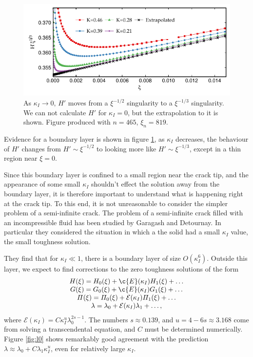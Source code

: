 \documentclass{jfm}
\begin{document}
\begin{figure}
  \centerline{\includegraphics{./../../Graphs/hprime-x.pdf}}
  \caption{As $\kappa_I\to 0$, $H'$ moves from a $\xi^{-1/2}$ singularity
           to a $\xi^{-1/3}$ singularity. We can not calculate $H'$ for $\kappa_I=0$, 
           but the extrapolation to it is shown. Figure produced with $n=465$,
           $\xi_n = 819$.}\label{fig:hprime-x}
\end{figure}
Evidence for a boundary layer is shown in figure \ref{fig:hprime-x}, as
$\kappa_I$ decreases, the behaviour of $H'$ changes from $H' \sim \xi^{-1/2}$
to looking more like $H' \sim \xi^{-1/3}$, except in a thin region near 
$\xi =0$.

Since this boundary layer is confined to a small region near the crack tip, and
the appearance of some small $\kappa_I$ shouldn't effect the solution away from
the boundary layer, it is therefore important to understand what is 
happening right at the crack tip. To this end, it is not unreasonable to 
consider the simpler problem of a semi-infinite crack. The problem of a 
semi-infinite crack filled with an incompressible fluid has been studied by
Garagash and Detournay. In particular they considered the situation in which a
the solid had a small $\kappa_I$ value, the small toughness solution. 

They find that for $\kappa_I \ll 1$, there is a boundary layer of size 
$O(\kappa_I^6)$. Outside this layer, we expect to find corrections to the 
zero toughness solutions of the form
\begin{equation}
\begin{array}{c}
H(\xi) = H_0(\xi) + \c{E}(\kappa_I) H_1(\xi) + \dots \\
G(\xi) = G_0(\xi) + \c{E}(\kappa_I) G_1(\xi) + \dots \\
\Pi(\xi) = \Pi_0(\xi) + \mathcal{E}(\kappa_I) \Pi_1(\xi) + \dots \\
\lambda = \lambda_0 + \mathcal{E}(\kappa_I) \lambda_1 + \dots, \\
\end{array}
\end{equation}
where $\mathcal{E}(\kappa_I) = C \kappa_I^u\lambda_0^{2s-1}$. The numbers 
$s \approx 0.139$, and $u = 4 -6s \approx 3.168$
come from solving a transcendental equation, and $C$ must be determined 
numerically. Figure \ref{fig:l0} shows remarkably good agreement with the
prediction $\lambda \approx \lambda_0 + C\lambda_1 \kappa_I^u$, even for 
relatively large $\kappa_I$.
\end{document}
